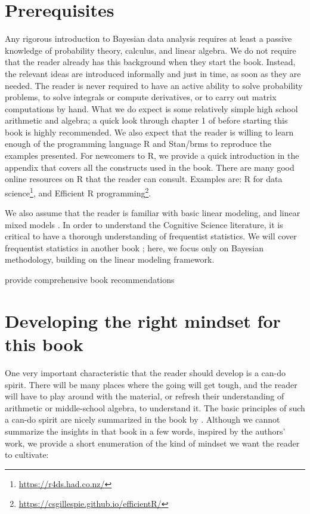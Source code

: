\documentclass[12pt,]{krantz}
\makeatletter
\renewcommand{\href}[2]{#2\footnote{\url{#1}}}
\newenvironment{kframe}{%
\medskip{}
\setlength{\fboxsep}{.8em}
 \def\at@end@of@kframe{}%
 \ifinner\ifhmode%
  \def\at@end@of@kframe{\end{minipage}}%
  \begin{minipage}{\columnwidth}%
 \fi\fi%
 \def\FrameCommand##1{\hskip\@totalleftmargin \hskip-\fboxsep
 \colorbox{shadecolor}{##1}\hskip-\fboxsep
     \hskip-\linewidth \hskip-\@totalleftmargin \hskip\columnwidth}%
 \MakeFramed {\advance\hsize-\width
   \@totalleftmargin\z@ \linewidth\hsize
   \@setminipage}}%
 {\par\unskip\endMakeFramed%
 \at@end@of@kframe}
\newenvironment{rmdblock}[1]
  {
  \begin{itemize}
  \renewcommand{\labelitemi}{
    \raisebox{-.7\height}[0pt][0pt]{
      {\setkeys{Gin}{width=3em,keepaspectratio}\texttt{[image: images/\#1]}}
    }
  }
  \setlength{\fboxsep}{1em}
  \begin{kframe}
  \item
  }
  {
  \end{kframe}
  \end{itemize}
  }
\newenvironment{rmdnote}
  {\begin{rmdblock}{note}}
  {\end{rmdblock}}
\theoremstyle{definition}
\theoremstyle{definition}
\theoremstyle{definition}
\theoremstyle{remark}
\makeatother
\begin{document}
\section{Prerequisites}\label{prerequisites}

Any rigorous introduction to Bayesian data analysis requires at least a
passive knowledge of probability theory, calculus, and linear algebra.
We do not require that the reader already has this background when they
start the book. Instead, the relevant ideas are introduced informally
and just in time, as soon as they are needed. The reader is never
required to have an active ability to solve probability problems, to
solve integrals or compute derivatives, or to carry out matrix
computations by hand. What we do expect is some relatively simple high
school arithmetic and algebra; a quick look through chapter 1 of
\citet{gill2006essential} before starting this book is highly
recommended. We also expect that the reader is willing to learn enough
of the programming language R \citep{R-base} and Stan/brms to reproduce
the examples presented. For newcomers to R, we provide a quick
introduction in the appendix that covers all the constructs used in the
book. There are many good online resources on R that the reader can
consult. Examples are: \href{https://r4ds.had.co.nz/}{R for data
science}, and \href{https://csgillespie.github.io/efficientR/}{Efficient
R programming}.

We also assume that the reader is familiar with basic linear modeling,
and linear mixed models \citep[\citet{baayen2008mixed}]{lme4new}. In
order to understand the Cognitive Science literature, it is critical to
have a thorough understanding of frequentist statistics. We will cover
frequentist statistics in another book \citep{VasishthEtAlFreq2021};
here, we focus only on Bayesian methodology, building on the linear
modeling framework.

\begin{rmdnote} provide comprehensive book recommendations
\end{rmdnote}

\section{Developing the right mindset for this
book}\label{developing-the-right-mindset-for-this-book}

One very important characteristic that the reader should develop is a
can-do spirit. There will be many places where the going will get tough,
and the reader will have to play around with the material, or refresh
their understanding of arithmetic or middle-school algebra, to
understand it. The basic principles of such a can-do spirit are nicely
summarized in the book by \citet{burger}. Although we cannot summarize
the insights in that book in a few words, inspired by the authors' work,
we provide a short enumeration of the kind of mindset we want the reader
to cultivate:
\end{document}
